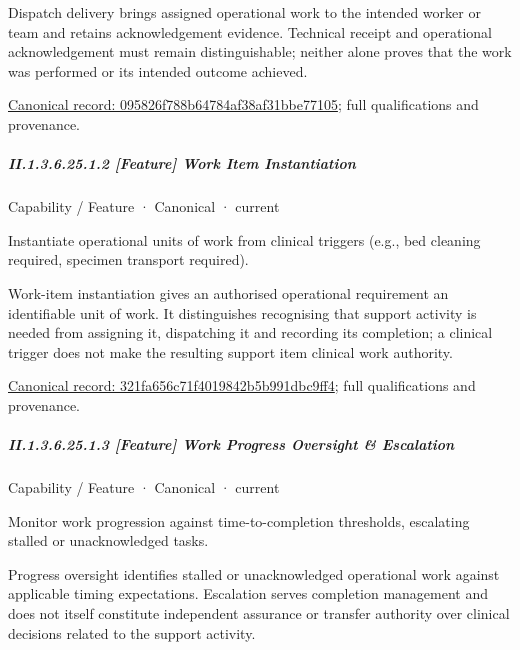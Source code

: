 Dispatch delivery brings assigned operational work to the intended worker or team and retains acknowledgement evidence. Technical receipt and operational acknowledgement must remain distinguishable; neither alone proves that the work was performed or its intended outcome achieved.


{\footnotesize \href{../../../../continuum/strategy/capability/feature/095826f788b64784af38af31bbe77105.md}{Canonical record: 095826f788b64784af38af31bbe77105}; full qualifications and provenance.}\par
\subparagraph*{II.1.3.6.25.1.2 [Feature] Work Item Instantiation}
\label{navigation:II.1.3.6.25.1.2}

\label{element:321fa656c71f4019842b5b991dbc9ff4}
{\small Capability / Feature · Canonical · current}\par

Instantiate operational units of work from clinical triggers (e.g., bed cleaning required, specimen transport required).



Work-item instantiation gives an authorised operational requirement an identifiable unit of work. It distinguishes recognising that support activity is needed from assigning it, dispatching it and recording its completion; a clinical trigger does not make the resulting support item clinical work authority.


{\footnotesize \href{../../../../continuum/strategy/capability/feature/321fa656c71f4019842b5b991dbc9ff4.md}{Canonical record: 321fa656c71f4019842b5b991dbc9ff4}; full qualifications and provenance.}\par
\subparagraph*{II.1.3.6.25.1.3 [Feature] Work Progress Oversight \& Escalation}
\label{navigation:II.1.3.6.25.1.3}

\label{element:abc12faeffd24917aad6748b0f0ca8d7}
{\small Capability / Feature · Canonical · current}\par

Monitor work progression against time-to-completion thresholds, escalating stalled or unacknowledged tasks.



Progress oversight identifies stalled or unacknowledged operational work against applicable timing expectations. Escalation serves completion management and does not itself constitute independent assurance or transfer authority over clinical decisions related to the support activity.


